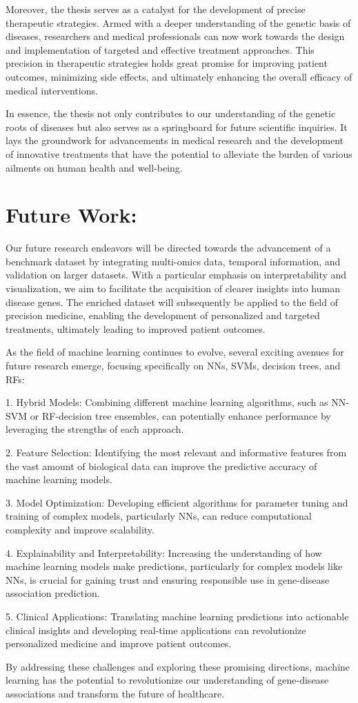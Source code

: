 Moreover, the thesis serves as a catalyst for the development of precise therapeutic strategies. Armed with a deeper understanding of the genetic basis of diseases, researchers and medical professionals can now work towards the design and implementation of targeted and effective treatment approaches. This precision in therapeutic strategies holds great promise for improving patient outcomes, minimizing side effects, and ultimately enhancing the overall efficacy of medical interventions.

In essence, the thesis not only contributes to our understanding of the genetic roots of diseases but also serves as a springboard for future scientific inquiries. It lays the groundwork for advancements in medical research and the development of innovative treatments that have the potential to alleviate the burden of various ailments on human health and well-being.

\section{Future Work:}

Our future research endeavors will be directed towards the advancement of a benchmark dataset by integrating multi-omics data, temporal information, and validation on larger datasets. With a particular emphasis on interpretability and visualization, we aim to facilitate the acquisition of clearer insights into human disease genes. The enriched dataset will subsequently be applied to the field of precision medicine, enabling the development of personalized and targeted treatments, ultimately leading to improved patient outcomes.

As the field of machine learning continues to evolve, several exciting avenues for future research emerge, focusing specifically on NNs, SVMs, decision trees, and RFs:

1. Hybrid Models: Combining different machine learning algorithms, such as NN-SVM or RF-decision tree ensembles, can potentially enhance performance by leveraging the strengths of each approach.

2. Feature Selection: Identifying the most relevant and informative features from the vast amount of biological data can improve the predictive accuracy of machine learning models.

3. Model Optimization: Developing efficient algorithms for parameter tuning and training of complex models, particularly NNs, can reduce computational complexity and improve scalability.

4. Explainability and Interpretability: Increasing the understanding of how machine learning models make predictions, particularly for complex models like NNs, is crucial for gaining trust and ensuring responsible use in gene-disease association prediction.

5. Clinical Applications: Translating machine learning predictions into actionable clinical insights and developing real-time applications can revolutionize personalized medicine and improve patient outcomes.

By addressing these challenges and exploring these promising directions, machine learning has the potential to revolutionize our understanding of gene-disease associations and transform the future of healthcare.
